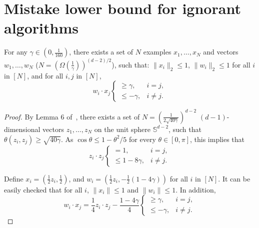 \section{Mistake lower bound for ignorant algorithms}

\begin{lemma}
For any $\gamma \in (0,\frac 1 {160})$,
there exists a set of $N$ examples $x_1, \ldots, x_N$ and vectors $w_1, \ldots, w_N$ ($N = (\Omega(\frac{1}{\gamma}))^{(d-2)/2}$), such that:
$\| x_i \|_2 \leq 1$, $\| w_i \|_2 \leq 1$ for all $i$ in $[N]$, and for all $i, j$ in $[N]$,
\[ w_i \cdot x_j \begin{cases} \geq \gamma ,& i = j, \\ \leq -\gamma ,& i \neq j. \end{cases} \]
\label{lem:embed_d_gamma}
\end{lemma}
\begin{proof}
By Lemma 6 of~\cite{Long1995}, there exists a set of $N = (\frac{1}{2\sqrt{40\gamma}})^{d-2}$ $(d-1)$-dimensional vectors $z_1, \ldots, z_N$ on the unit sphere $\mathbb{S}^{d-2}$, such that
$\theta(z_i, z_j) \geq \sqrt{40 \gamma}$. As $\cos\theta \leq 1-\theta^2/5$ for every $\theta \in [0,\pi]$,
this implies that
\[ z_i \cdot z_j \begin{cases} = 1 ,& i = j, \\ \leq 1- 8\gamma ,& i \neq j. \end{cases} \]

Define $x_i = (\frac12 z_i, \frac12)$, and $w_i = (\frac 12 z_i, -\frac 12(1-4\gamma))$ for all $i$ in $[N]$. It can be easily checked that for all $i$, $\|x_i\| \leq 1$ and $\|w_i\| \leq 1$. In addition,
\[ w_i \cdot x_j = \frac 1 4 z_i \cdot z_j - \frac {1-4\gamma} 4 \begin{cases} \geq \gamma ,& i = j, \\ \leq -\gamma ,& i \neq j. \end{cases}\]
\end{proof}
